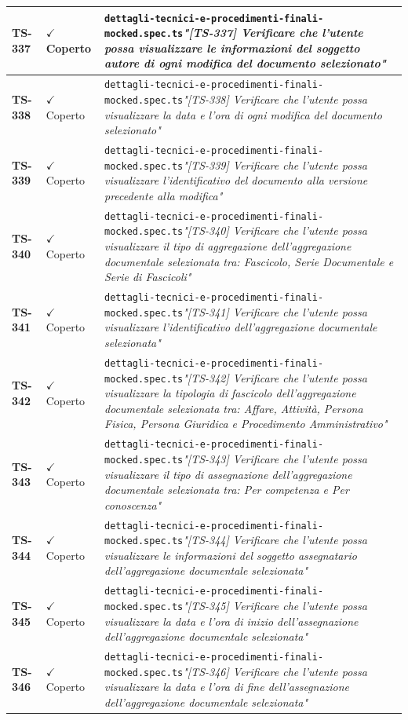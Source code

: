 \documentclass[a4paper,12pt]{article}
\newcommand{\ok}{\textcolor{green!60!black}{$\checkmark$ Coperto}}
\newcommand{\f}[1]{\nolinkurl{#1}\newline}
\newcommand{\q}[1]{\textit{#1}}
\begin{document}
\begin{longtable}{|p{1.5cm}|p{3.0cm}|p{10.5cm}|}
\textbf{TS-337} & \ok & \f{dettagli-tecnici-e-procedimenti-finali-mocked.spec.ts}\q{"[TS-337] Verificare che l'utente possa visualizzare le informazioni del soggetto autore di ogni modifica del documento selezionato"} \\ \hline
\textbf{TS-338} & \ok & \f{dettagli-tecnici-e-procedimenti-finali-mocked.spec.ts}\q{"[TS-338] Verificare che l'utente possa visualizzare la data e l'ora di ogni modifica del documento selezionato"} \\ \hline
\textbf{TS-339} & \ok & \f{dettagli-tecnici-e-procedimenti-finali-mocked.spec.ts}\q{"[TS-339] Verificare che l'utente possa visualizzare l'identificativo del documento alla versione precedente alla modifica"} \\ \hline
\textbf{TS-340} & \ok & \f{dettagli-tecnici-e-procedimenti-finali-mocked.spec.ts}\q{"[TS-340] Verificare che l'utente possa visualizzare il tipo di aggregazione dell'aggregazione documentale selezionata tra: Fascicolo, Serie Documentale e Serie di Fascicoli"} \\ \hline
\textbf{TS-341} & \ok & \f{dettagli-tecnici-e-procedimenti-finali-mocked.spec.ts}\q{"[TS-341] Verificare che l'utente possa visualizzare l'identificativo dell'aggregazione documentale selezionata"} \\ \hline
\textbf{TS-342} & \ok & \f{dettagli-tecnici-e-procedimenti-finali-mocked.spec.ts}\q{"[TS-342] Verificare che l'utente possa visualizzare la tipologia di fascicolo dell'aggregazione documentale selezionata tra: Affare, Attività, Persona Fisica, Persona Giuridica e Procedimento Amministrativo"} \\ \hline
\textbf{TS-343} & \ok & \f{dettagli-tecnici-e-procedimenti-finali-mocked.spec.ts}\q{"[TS-343] Verificare che l'utente possa visualizzare il tipo di assegnazione dell'aggregazione documentale selezionata tra: Per competenza e Per conoscenza"} \\ \hline
\textbf{TS-344} & \ok & \f{dettagli-tecnici-e-procedimenti-finali-mocked.spec.ts}\q{"[TS-344] Verificare che l'utente possa visualizzare le informazioni del soggetto assegnatario dell'aggregazione documentale selezionata"} \\ \hline
\textbf{TS-345} & \ok & \f{dettagli-tecnici-e-procedimenti-finali-mocked.spec.ts}\q{"[TS-345] Verificare che l'utente possa visualizzare la data e l'ora di inizio dell'assegnazione dell'aggregazione documentale selezionata"} \\ \hline
\textbf{TS-346} & \ok & \f{dettagli-tecnici-e-procedimenti-finali-mocked.spec.ts}\q{"[TS-346] Verificare che l'utente possa visualizzare la data e l'ora di fine dell'assegnazione dell'aggregazione documentale selezionata"} \\ \hline

\end{longtable}
\end{document}
